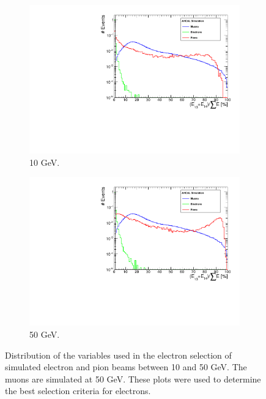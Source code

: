 \begin{figure}[htbp!]
\begin{subfigure}[t]{0.5\textwidth}
		\includegraphics[width=1\linewidth]{../Thesis_Plots/Timing/Electrons/Plots/SelectionCut_EnergyLastLayers_10GeV}
		\caption{10 GeV.} \label{fig:e10GeV_Elast}
	\end{subfigure}
	\hfill
	\begin{subfigure}[t]{0.5\textwidth}
		\centering
		\includegraphics[width=1\linewidth]{../Thesis_Plots/Timing/Electrons/Plots/SelectionCut_EnergyLastLayers_50GeV}
		\caption{50 GeV.} \label{fig:e50GeV_Elast}
	\end{subfigure}
	\caption{Distribution of the variables used in the electron selection of simulated electron and pion beams between 10 and 50 GeV. The muons are simulated at 50 GeV. These plots were used to determine the best selection criteria for electrons.} \label{fig:electronselection}
\end{figure}


